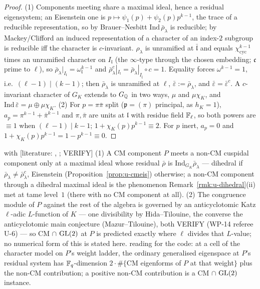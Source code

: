 \documentclass[11pt]{article}
\newcommand{\LIT}[1]{\textsf{[literature: #1]}}   %
\newcommand{\VERIFYloc}{\textsf{VERIFY}}          %
\begin{document}
\begin{proof}
(1) Components meeting share a maximal ideal, hence a residual eigensystem; an Eisenstein one is $p\mapsto\psi_1(p)+\psi_2(p)p^{k-1}$, the trace of a reducible
representation, so by Brauer--Nesbitt $\mathrm{Ind}\,\bar\rho_\lambda$ is reducible; by Mackey/Clifford an induced representation of a character of an index-$2$
subgroup is reducible iff the character is $c$-invariant. $\rho_\lambda$ is unramified at $\bar{\mathfrak l}$ and equals $\chi_{\mathrm{cyc}}^{k-1}$ times an unramified character on
$I_{\mathfrak l}$ (the $\infty$-type through the chosen embedding; $\mathfrak c$ prime to $\ell$), so $\bar\rho_\lambda|_{I_{\mathfrak l}}=\omega_{\mathfrak l}^{k-1}$ and
$\bar\rho^{c}_\lambda|_{I_{\mathfrak l}}=\bar\rho_\lambda|_{I_{\bar{\mathfrak l}}}\circ c=1$. Equality forces $\omega^{k-1}=1$, i.e.\ $(\ell-1)\mid(k-1)$; then $\bar\rho_\lambda$ is unramified at $\ell$,
$\bar\varepsilon:=\bar\rho_\lambda$, and $\bar\varepsilon=\bar\varepsilon^{c}$. A $c$-invariant character of $G_K$ extends to $G_{\mathbb{Q}}$ in two ways, $\mu$ and $\mu\chi_K$, and $\mathrm{Ind}\,\bar\varepsilon=\mu\oplus\mu\chi_K$.
(2) For $p=\pi\bar\pi$ split ($\mathfrak p=(\pi)$ principal, as $h_K=1$), $a_p=\pi^{k-1}+\bar\pi^{k-1}$ and $\pi,\bar\pi$ are units at $\mathfrak l$ with residue field $\mathbb{F}_\ell$, so both powers are $\equiv1$ when
$(\ell-1)\mid k-1$; $1+\chi_K(p)p^{k-1}\equiv2$. For $p$ inert, $a_p=0$ and $1+\chi_K(p)p^{k-1}=1-p^{k-1}\equiv0$.
\end{proof}

\begin{remark}[CM $\cap$ $\GL(2)$]\label{rmk:u-cmgl2}
\CONJ{} with \LIT{\cite{hida_tilouine}, \cite{mazur_tilouine}; \VERIFYloc} (1) \PROVED{} A CM component $P$ meets a non-CM cuspidal component only at a maximal ideal whose
residual $\bar\rho$ is $\mathrm{Ind}_{G_K}\bar\rho_\lambda$ --- dihedral if $\bar\rho_\lambda\ne\bar\rho_\lambda^{c}$, Eisenstein (Proposition~\ref{prop:u-cmeis}) otherwise; a
non-CM component through a dihedral maximal ideal is the phenomenon Remark~\ref{rmk:u-dihedral}(ii) met at tame level~$1$ (there with no CM component at all). (2) The
congruence module of $P$ against the rest of the algebra is governed by an anticyclotomic Katz $\ell$-adic $L$-function of $K$ --- one divisibility by Hida--Tilouine,
the converse the anticyclotomic main conjecture (Mazur--Tilouine), both \VERIFYloc{} (WP-14 referee U-6) --- so CM $\cap$ $\GL(2)$ at $P$ is predicted exactly where $\ell$ divides that $L$-value; no numerical form of this is stated here.
\COMP{} reading for the code: at a cell of the character model on $P$'s weight ladder, the ordinary generalised eigenspace at $P$'s residual system has $\mathbb{F}_q$-dimension
$2\cdot\#\{$CM eigenforms of $P$ at that weight$\}$ plus the non-CM contribution; a positive non-CM contribution is a CM $\cap$ $\GL(2)$ instance.
\end{remark}
\end{document}

